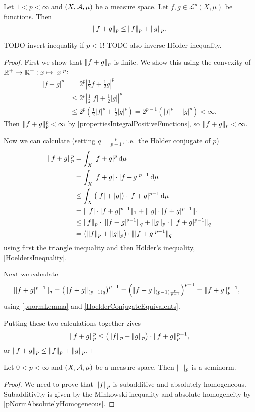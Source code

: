 \begin{theorem} \label{MinkowskisInequality}
Let $1< p<\infty$ and $\sSet{X,\mathcal{A},\mu}$ be a measure space. Let $f,g\in\mathcal{L}^p(X,\mu)$ be functions. Then
\[ \lVert f+g\rVert_p \leq \lVert f\rVert_p + \lVert g\rVert_p. \]
\end{theorem}
TODO invert inequality if $p<1$! TODO also inverse Hölder inequality.
\begin{proof}
First we show that $\lVert f+g\rVert_p$ is finite. We show this using the convexity of $\mathbb{R}^+\to \mathbb{R}^+: x\mapsto |x|^p$:
\begin{align*}
|f+g|^p &= 2^p\left|\frac{1}{2}f+ \frac{1}{2}g\right|^p \\
&\leq 2^p\left|\frac{1}{2}|f|+ \frac{1}{2}|g|\right|^p \\
&\leq 2^p\left(\frac{1}{2}|f|^p + \frac{1}{2}|g|^p\right) = 2^{p-1}\left(|f|^p + |g|^p\right) < \infty.
\end{align*}
Then $\lVert f+g\rVert_p^p < \infty$ by \ref{propertiesIntegralPositiveFunctions}, so $\lVert f+g\rVert_p < \infty$.

Now we can calculate (setting $q = \frac{p}{p-1}$, i.e.\ the Hölder conjugate of $p$)
\begin{align*}
\lVert f+g\rVert_p^p &= \int_X|f+g|^p\operatorname{d \!}{\mu} \\
&= \int_X|f+g|\cdot |f+g|^{p-1}\operatorname{d \!}{\mu} \\
&\leq \int_X\big(|f|+|g|\big)\cdot |f+g|^{p-1}\operatorname{d \!}{\mu} \\
&= \lVert|f|\cdot |f+g|^{p-1}\rVert_1 + \lVert|g|\cdot |f+g|^{p-1}\rVert_1 \\
&\leq \lVert f\rVert_p\cdot \lVert|f+g|^{p-1}\rVert_q + \lVert g\rVert_p\cdot \lVert|f+g|^{p-1}\rVert_q \\
&= \big(\lVert f\rVert_p + \lVert g\rVert_p\big)\cdot \lVert|f+g|^{p-1}\rVert_q
\end{align*}
using first the triangle inequality and then Hölder's inequality, \ref{HoeldersInequality}.

Next we calculate
\begin{align*}
\lVert|f+g|^{p-1}\rVert_q &= \left(\lVert f+g\rVert_{(p-1)q}\right)^{p-1} = \left(\lVert f+g\rVert_{(p-1)\frac{p}{p-1}}\right)^{p-1} = \lVert f+g\rVert_{p}^{p-1},
\end{align*}
using \ref{pnormLemma} and \ref{HoelderConjugateEquivalents}.

Putting these two calculations together gives
\[ \lVert f+g\rVert_p^p \leq \big(\lVert f\rVert_p + \lVert g\rVert_p\big)\cdot \lVert f+g\rVert_{p}^{p-1}, \]
or $\lVert f+g\rVert_p \leq \lVert f\rVert_p + \lVert g\rVert_p$.
\end{proof}
\begin{corollary}
Let $0< p<\infty$ and $\sSet{X,\mathcal{A},\mu}$ be a measure space. Then $\lVert\cdot\rVert_{p}$ is a seminorm.
\end{corollary}
\begin{proof}
We need to prove that $\lVert f\rVert_{p}$ is subadditive and absolutely homogeneous. Subadditivity is given by the Minkowski inequality and absolute homogeneity by \ref{pNormAbsolutelyHomogeneous}.
\end{proof}

